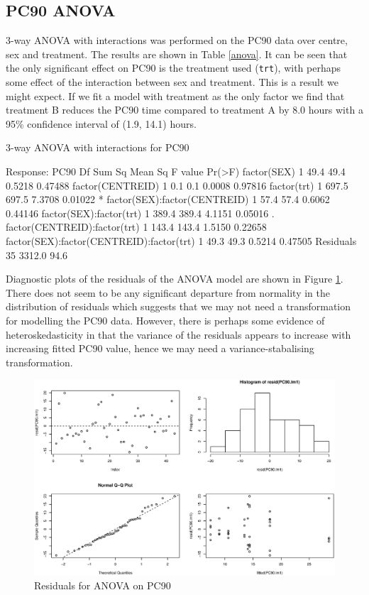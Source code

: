 \subsection{PC90 ANOVA} 
3-way ANOVA with interactions was performed on the PC90 data over centre, sex and treatment. The results are shown in Table \ref{anova}. It can be seen that the only significant effect on PC90 is the treatment used (\texttt{trt}), with perhaps some effect of the interaction between sex and treatment. This is a result we might expect. If we fit a model with treatment as the only factor we find that treatment B reduces the PC90 time compared to treatment A by 8.0 hours with a 95\% confidence interval of (1.9, 14.1) hours.
\begin{table}[h]
\centering
\caption{3-way ANOVA with interactions for PC90}\label{anova}
\begin{boxedverbatim}
Response: PC90
                                         Df Sum Sq Mean Sq F value  Pr(>F)  
factor(SEX)                               1   49.4    49.4  0.5218 0.47488  
factor(CENTREID)                          1    0.1     0.1  0.0008 0.97816  
factor(trt)                               1  697.5   697.5  7.3708 0.01022 *
factor(SEX):factor(CENTREID)              1   57.4    57.4  0.6062 0.44146  
factor(SEX):factor(trt)                   1  389.4   389.4  4.1151 0.05016 .
factor(CENTREID):factor(trt)              1  143.4   143.4  1.5150 0.22658  
factor(SEX):factor(CENTREID):factor(trt)  1   49.3    49.3  0.5214 0.47505  
Residuals                                35 3312.0    94.6
\end{boxedverbatim}
\end{table}

Diagnostic plots of the residuals of the ANOVA model are shown in Figure \ref{resid}. There does not seem to be any significant departure from normality in the distribution of residuals which suggests that we may not need a transformation for modelling the PC90 data. However, there is perhaps some evidence of heteroskedasticity in that the variance of the residuals appears to increase with increasing fitted PC90 value, hence we may need a variance-stabalising transformation.
\begin{figure}
\centering
\includegraphics[scale=0.8]{PC90diag.eps}
\caption{Residuals for ANOVA on PC90}\label{resid}
\end{figure}
